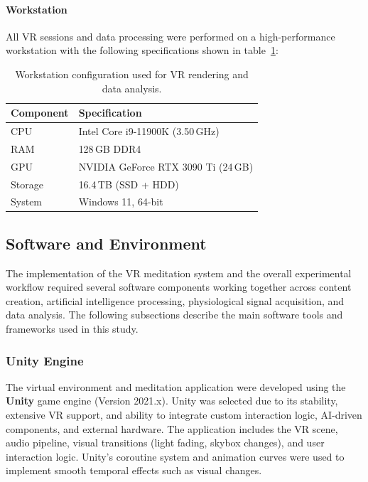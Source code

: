 \paragraph{Workstation}

All VR sessions and data processing were performed on a high-performance workstation
with the following specifications shown in table~\ref{tab:workstation}:

\begin{table}[H]
\centering

\caption{Workstation configuration used for VR rendering and data analysis.}
\label{tab:workstation}
\begin{tabular}{ll}
\toprule
\textbf{Component} & \textbf{Specification} \\
\midrule
CPU & Intel Core i9-11900K (3.50\,GHz) \\
RAM & 128\,GB DDR4 \\
GPU & NVIDIA GeForce RTX 3090 Ti (24\,GB) \\
Storage & 16.4\,TB (SSD + HDD) \\
System & Windows 11, 64-bit \\
\bottomrule
\end{tabular}

\end{table}


\subsection{Software and Environment}
The implementation of the VR meditation system and the overall experimental workflow required several software components working together across content creation, artificial intelligence processing, physiological signal acquisition, and data analysis. The following subsections describe the main software tools and frameworks used in this study.

\subsubsection{Unity Engine}

The virtual environment and meditation application were developed using the \textbf{Unity} game engine (Version 2021.x). Unity was selected due to its stability, extensive VR support, and ability to integrate custom interaction logic, AI-driven components, and external hardware. The application includes the VR scene, audio pipeline, visual transitions (light fading, skybox changes), and user interaction logic. Unity’s coroutine system and animation curves were used to implement smooth temporal effects such as visual changes.

